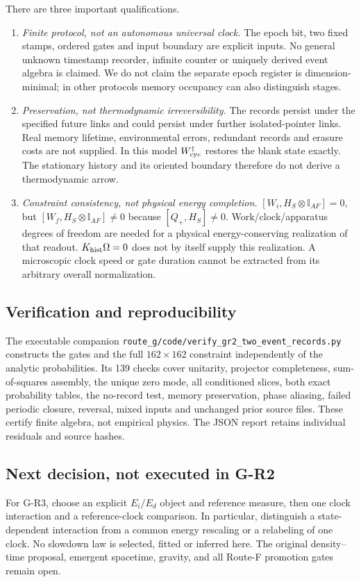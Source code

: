 \documentclass[11pt,a4paper]{article}
\newcommand{\id}{\mathbb I}
\begin{document}
There are three important qualifications.
\begin{enumerate}
 \item \emph{Finite protocol, not an autonomous universal clock.}
 The epoch bit, two fixed stamps, ordered gates and input boundary
 are explicit inputs. No general unknown timestamp recorder, infinite
 counter or uniquely derived event algebra is claimed. We do not
 claim the separate epoch register is dimension-minimal; in other
 protocols memory occupancy can also distinguish stages.
 \item \emph{Preservation, not thermodynamic irreversibility.}
 The records persist under the specified future links and could
 persist under further isolated-pointer links. Real memory lifetime,
 environmental errors, redundant records and erasure costs are not
 supplied. In this model $W_{\rm cyc}^\dagger$ restores the blank
 state exactly. The stationary history and its oriented boundary
 therefore do not derive a thermodynamic arrow.
 \item \emph{Constraint consistency, not physical energy completion.}
 $[W_i,H_S\otimes\id_{AF}]=0$, but
 $[W_f,H_S\otimes\id_{AF}]\neq0$ because
 $[Q_+,H_S]\neq0$. Work/clock/apparatus degrees of freedom are needed
 for a physical energy-conserving realization of that readout.
 $K_{\rm hist}\Omega=0$ does not by itself supply this realization.
 A microscopic clock speed or gate duration cannot be extracted
 from its arbitrary overall normalization.
\end{enumerate}

\subsection*{Verification and reproducibility}
The executable companion
\texttt{route\_g/code/verify\_gr2\_two\_event\_records.py}
constructs the gates and the full $162\times162$ constraint independently
of the analytic probabilities. Its 139 checks cover unitarity,
projector completeness, sum-of-squares assembly, the unique zero mode,
all conditioned slices, both exact probability tables, the no-record
test, memory preservation, phase aliasing, failed periodic closure,
reversal, mixed inputs and unchanged prior source files.
These certify finite algebra, not empirical physics.
The JSON report retains individual residuals and source hashes.

\subsection*{Next decision, not executed in G-R2}
For G-R3, choose an explicit $E_i/E_d$ object and reference measure,
then one clock interaction and a reference-clock comparison.
In particular, distinguish a state-dependent interaction from a common
energy rescaling or a relabeling of one clock. No slowdown law is
selected, fitted or inferred here. The original density--time proposal,
emergent spacetime, gravity, and all Route-F promotion gates remain open.
\end{document}
